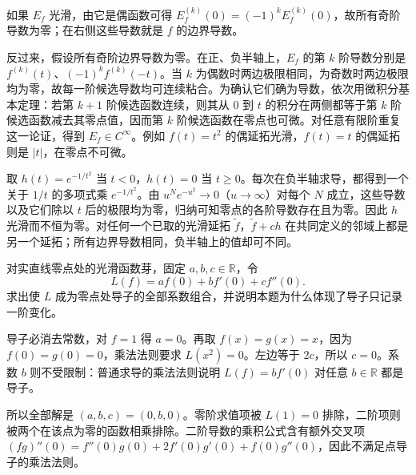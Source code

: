 \begin{solution}
	如果 \(E_f\) 光滑，由它是偶函数可得 \(E_f^{(k)}(0)=(-1)^kE_f^{(k)}(0)\)，故所有奇阶导数为零；在右侧这些导数就是 \(f\) 的边界导数。

	反过来，假设所有奇阶边界导数为零。在正、负半轴上，\(E_f\) 的第 \(k\) 阶导数分别是 \(f^{(k)}(t)\)、\((-1)^kf^{(k)}(-t)\)。当 \(k\) 为偶数时两边极限相同，为奇数时两边极限均为零，故每一阶候选导数均可连续粘合。为确认它们确为导数，依次用微积分基本定理：若第 \(k+1\) 阶候选函数连续，则其从 \(0\) 到 \(t\) 的积分在两侧都等于第 \(k\) 阶候选函数减去其零点值，因而第 \(k\) 阶候选函数在零点也可微。对任意有限阶重复这一论证，得到 \(E_f\in C^\infty\)。例如 \(f(t)=t^2\) 的偶延拓光滑，\(f(t)=t\) 的偶延拓则是 \(|t|\)，在零点不可微。

	取 \(h(t)=e^{-1/t^2}\) 当 \(t<0\)，\(h(t)=0\) 当 \(t\geq0\)。每次在负半轴求导，都得到一个关于 \(1/t\) 的多项式乘 \(e^{-1/t^2}\)。由 \(u^Ne^{-u^2}\to0\)（\(u\to\infty\)）对每个 \(N\) 成立，这些导数以及它们除以 \(t\) 后的极限均为零，归纳可知零点的各阶导数存在且为零。因此 \(h\) 光滑而不恒为零。对任何一个已取的光滑延拓 \(\widetilde f\)，\(\widetilde f+c h\) 在共同定义的邻域上都是另一个延拓；所有边界导数相同，负半轴上的值却可不同。
\end{solution}
\begin{exercise}
	\label{g1:ex:point-derivation-orders}
	对实直线零点处的光滑函数芽，固定 \(a,b,c\in\mathbb R\)，令
	\[
		L(f)=a f(0)+b f'(0)+c f''(0).
	\]
	求出使 \(L\) 成为零点处导子的全部系数组合，并说明本题为什么体现了导子只记录一阶变化。
\end{exercise}
\begin{solution}
	导子必消去常数，对 \(f=1\) 得 \(a=0\)。再取 \(f(x)=g(x)=x\)，因为 \(f(0)=g(0)=0\)，乘法法则要求 \(L(x^2)=0\)。左边等于 \(2c\)，所以 \(c=0\)。系数 \(b\) 则不受限制：普通求导的乘法法则说明 \(L(f)=b f'(0)\) 对任意 \(b\in\mathbb R\) 都是导子。

	所以全部解是 \((a,b,c)=(0,b,0)\)。零阶求值项被 \(L(1)=0\) 排除，二阶项则被两个在该点为零的函数相乘排除。二阶导数的乘积公式含有额外交叉项 \((fg)''(0)=f''(0)g(0)+2f'(0)g'(0)+f(0)g''(0)\)，因此不满足点导子的乘法法则。
\end{solution}

